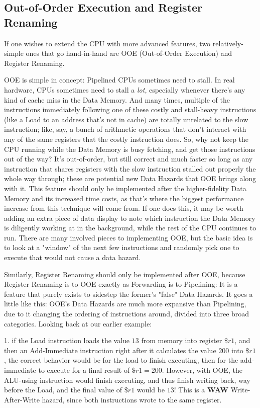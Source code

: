 \documentclass[12pt,twoside]{reedthesis}
\begin{document}
\subsection{Out-of-Order Execution and Register Renaming}

If one wishes to extend the CPU with more advanced features, two relatively-simple ones that go hand-in-hand are OOE (Out-of-Order Execution) and Register Renaming.

OOE is simple in concept: Pipelined CPUs sometimes need to stall. In real hardware, CPUs sometimes need to stall a \textit{lot}, especially whenever there's any kind of cache miss in the Data Memory. And many times, multiple of the instructions immediately following one of these costly and stall-heavy instructions (like a Load to an address that's not in cache) are totally unrelated to the slow instruction; like, say, a bunch of arithmetic operations that don't interact with any of the same registers that the costly instruction does. So, why not keep the CPU running while the Data Memory is busy fetching, and get those instructions out of the way? It's out-of-order, but still correct and much faster so long as any instruction that shares registers with the slow instruction stalled out properly the whole way through; these are potential new Data Hazards that OOE brings along with it. This feature should only be implemented after the higher-fidelity Data Memory and its increased time costs, as that's where the biggest performance increase from this technique will come from. If one does this, it may be worth adding an extra piece of data display to note which instruction the Data Memory is diligently working at in the background, while the rest of the CPU continues to run. There are many involved pieces to implementing OOE, but the basic idea is to look at a "window" of the next few instructions and randomly pick one to execute that would not cause a data hazard.

Similarly, Register Renaming should only be implemented after OOE, because Register Renaming is to OOE exactly as Forwarding is to Pipelining: It is a feature that purely exists to sidestep the former's "false" Data Hazards. It goes a little like this: OOE's Data Hazards are much more expansive than Pipelining, due to it changing the ordering of instructions around, divided into three broad categories. Looking back at our earlier example:

1. if the Load instruction loads the value $13$ from memory into register $\$r1$, and then an Add-Immediate instruction right after it calculates the value $200$ into $\$r1$, the correct behavior would be for the load to finish executing, then for the add-immediate to execute for a final result of $\$r1 = 200$. However, with OOE, the ALU-using instruction would finish executing, and thus finish writing back, way before the Load, and the final value of $\$r1$ would be $13$! This is a \textbf{WAW} Write-After-Write hazard, since both instructions wrote to the same register.
\end{document}
